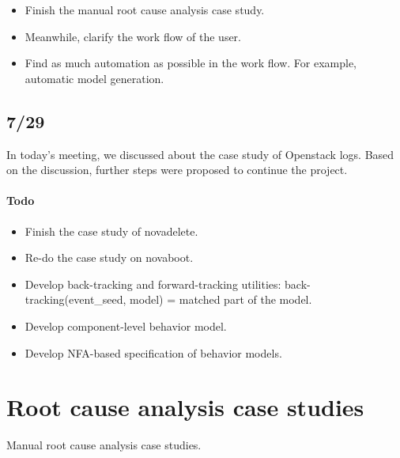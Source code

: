 \documentclass{article}
\begin{document}
\begin{itemize}
\item Finish the manual root cause analysis case study.
\item Meanwhile, clarify the work flow of the user.
\item Find as much automation as possible in the work flow. For example,
  automatic model generation.
\end{itemize}

\subsection{7/29}
\label{sec:meeting:729}

In today's meeting, we discussed about the case study of Openstack logs. Based
on the discussion, further steps were proposed to continue the project.

\paragraph{Todo}
\begin{itemize}
\item Finish the case study of novadelete.
\item Re-do the case study on novaboot.
\item Develop back-tracking and forward-tracking utilities:
  back-tracking(event\_seed, model) = matched part of the model.
\item Develop component-level behavior model.
\item Develop NFA-based specification of behavior models.
\end{itemize}

\section{Root cause analysis case studies}
Manual root cause analysis case studies.
\end{document}
